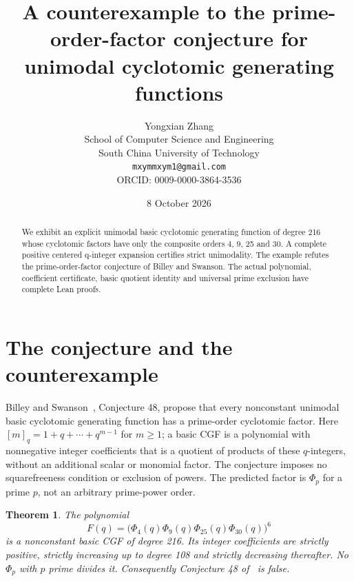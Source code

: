 \documentclass[11pt]{article}
\title{A counterexample to the prime-order-factor conjecture for unimodal cyclotomic generating functions}
\author{Yongxian Zhang\\[2pt]\small School of Computer Science and Engineering\\\small South China University of Technology\\\small\texttt{mxymmxym1@gmail.com}\\\small ORCID: 0009-0000-3864-3536}
\date{8 October 2026}
\newtheorem{theorem}{Theorem}
\begin{document}
\maketitle
\begin{abstract}We exhibit an explicit unimodal basic cyclotomic generating function of degree 216 whose cyclotomic factors have only the composite orders 4, 9, 25 and 30. A complete positive centered q-integer expansion certifies strict unimodality. The example refutes the prime-order-factor conjecture of Billey and Swanson. The actual polynomial, coefficient certificate, basic quotient identity and universal prime exclusion have complete Lean proofs.\end{abstract}
\section{The conjecture and the counterexample}
Billey and Swanson~\cite{BS}, Conjecture 48, propose that every nonconstant
unimodal basic cyclotomic generating function has a prime-order cyclotomic
factor. Here $[m]_q=1+q+\cdots+q^{m-1}$ for $m\ge1$; a basic CGF is a
polynomial with nonnegative integer coefficients that is a quotient of
products of these $q$-integers, without an additional scalar or monomial
factor. The conjecture imposes no squarefreeness condition or exclusion
of powers. The predicted factor is $\Phi_p$ for a prime $p$, not an
arbitrary prime-power order.

\begin{theorem}
The polynomial
\[
 F(q)=\bigl(\Phi_4(q)\Phi_9(q)\Phi_{25}(q)\Phi_{30}(q)\bigr)^6
\]
is a nonconstant basic CGF of degree 216. Its integer coefficients are
strictly positive, strictly increasing up to degree 108 and strictly
decreasing thereafter. No $\Phi_p$ with $p$ prime divides it.
Consequently Conjecture 48 of~\cite{BS} is false.
\end{theorem}
\end{document}
